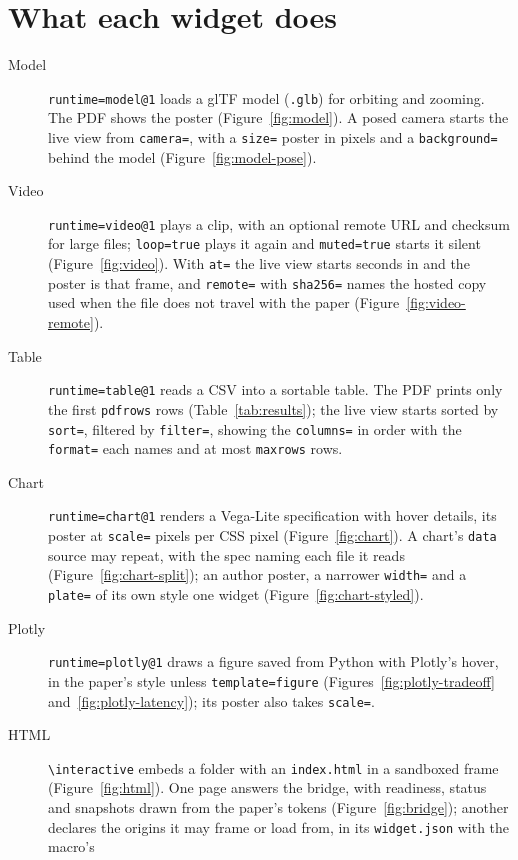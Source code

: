 \documentclass{article}
\theoremstyle{definition}
\begin{document}
\section{What each widget does}\label{sec:guide}
\begin{description}
\item[Model] \verb|runtime=model@1| loads a glTF model (\texttt{.glb}) for orbiting
  and zooming. The PDF shows the poster (Figure~\ref{fig:model}). A posed
  camera starts the live view from \verb|camera=|, with a \verb|size=| poster
  in pixels and a \verb|background=| behind the model (Figure~\ref{fig:model-pose}).
\item[Video] \verb|runtime=video@1| plays a clip, with an optional remote URL
  and checksum for large files; \verb|loop=true| plays it again and
  \verb|muted=true| starts it silent (Figure~\ref{fig:video}). With
  \verb|at=| the live view starts seconds in and the poster is that frame,
  and \verb|remote=| with \verb|sha256=| names the hosted copy used when the
  file does not travel with the paper (Figure~\ref{fig:video-remote}).
\item[Table] \verb|runtime=table@1| reads a CSV into a sortable table. The PDF
  prints only the first \texttt{pdfrows} rows (Table~\ref{tab:results}); the
  live view starts sorted by \verb|sort=|, filtered by \verb|filter=|, showing
  the \verb|columns=| in order with the \verb|format=| each names and at most
  \verb|maxrows| rows.
\item[Chart] \verb|runtime=chart@1| renders a Vega-Lite specification with
  hover details, its poster at \verb|scale=| pixels per CSS pixel
  (Figure~\ref{fig:chart}). A chart's \verb|data| source may repeat, with the
  spec naming each file it reads (Figure~\ref{fig:chart-split}); an author
  poster, a narrower \verb|width=| and a \verb|plate=| of its own style one
  widget (Figure~\ref{fig:chart-styled}).
\item[Plotly] \verb|runtime=plotly@1| draws a figure saved from Python with
  Plotly's hover, in the paper's style unless \verb|template=figure|
  (Figures~\ref{fig:plotly-tradeoff} and~\ref{fig:plotly-latency}); its
  poster also takes \verb|scale=|.
\item[HTML] \verb|\interactive| embeds a folder with an \texttt{index.html} in a
  sandboxed frame (Figure~\ref{fig:html}). One page answers the bridge, with
  readiness, status and snapshots drawn from the paper's tokens
  (Figure~\ref{fig:bridge}); another declares the origins it may frame or
  load from, in its \texttt{widget.json} with the macro's

\end{description}
\end{document}
